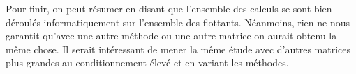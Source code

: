 \documentclass[12,french]{report}
\begin{document}
Pour finir, on peut résumer en disant que l'ensemble des calculs se sont bien déroulés informatiquement sur l'ensemble des flottants. Néanmoins, rien ne nous garantit qu'avec une autre méthode ou une autre matrice on aurait obtenu la même chose. Il serait intéressant de mener la même étude avec d'autres matrices plus grandes au conditionnement élevé et en variant les méthodes.
\end{document}
